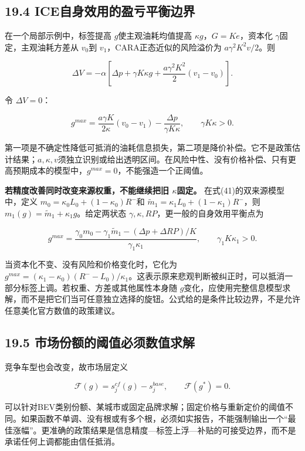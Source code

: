 \documentclass[
  11pt,
]{article}
\begin{document}
\subsection{19.4
ICE自身效用的盈亏平衡边界}\label{iceux81eaux8eabux6548ux7528ux7684ux76c8ux4e8fux5e73ux8861ux8fb9ux754c}

在一个局部示例中，标签提高 \(g\)使主观油耗均值提高
\(\kappa g\)，\(G=Ke\)，资本化 \(\gamma\)固定，主观油耗方差从 \(v_0\)到
\(v_1\)，CARA正态近似的风险溢价为 \(a\gamma^2K^2v/2\)。则

\[
\Delta V=-\alpha\left[
\Delta p+\gamma K\kappa g
+\frac{a\gamma^2K^2}{2}(v_1-v_0)
\right]. \tag{84}
\]

令 \(\Delta V=0\)：

\[
\boxed{
 g^{max}=\frac{a\gamma K}{2\kappa}(v_0-v_1)
-\frac{\Delta p}{\gamma K\kappa},\qquad\gamma K\kappa>0.
}
\tag{85}
\]

第一项是不确定性降低可抵消的油耗信息损失，第二项是降价补偿。它不是政策估计结果；\(a,\kappa,v\)须独立识别或给出透明区间。在风险中性、没有价格补偿、只有更高预期成本的模型中，\(g^{max}=0\)，不能强造一个正阈值。

\textbf{若精度改善同时改变来源权重，不能继续把旧 \(\kappa\)固定。}
在式(41)的双来源模型中，定义 \(m_0=\kappa_0L_0+(1-\kappa_0)R^-\)和
\(\widetilde m_1=\kappa_1L_0+(1-\kappa_1)R^-\)，则
\(m_1(g)=\widetilde m_1+\kappa_1g\)。给定两状态
\(\gamma,\kappa,RP\)，更一般的自身效用平衡点为

\[
\boxed{g^{max}
=\frac{\gamma_0m_0-\gamma_1\widetilde m_1-(\Delta p+\Delta RP)/K}
{\gamma_1\kappa_1},\qquad\gamma_1K\kappa_1>0.}
\tag{85a}
\]

当资本化不变、没有风险和价格变化时，它化为
\(g^{max}=(\kappa_1-\kappa_0)(R^--L_0)/\kappa_1\)。这表示原来悲观判断被纠正时，可以抵消一部分标签上调。若权重、方差或其他属性本身随
\(g\)变化，应使用完整信息模型求解，而不是把它们当可任意独立选择的旋钮。公式给的是条件比较边界，不是允许任意美化官方数值的政策建议。

\subsection{19.5
市场份额的阈值必须数值求解}\label{ux5e02ux573aux4efdux989dux7684ux9608ux503cux5fc5ux987bux6570ux503cux6c42ux89e3}

竞争车型也会改变，故市场层定义

\[
\mathcal F(g)=s_j^{cf}(g)-s_j^{base},\qquad
\mathcal F(g^*)=0. \tag{86}
\]

可以针对BEV类别份额、某城市或固定品牌求解；固定价格与重新定价的阈值不同。如果函数不单调、没有根或有多个根，必须如实报告，不能强制输出一个``最佳涨幅''。更准确的政策结果是信息精度---标签上浮---补贴的可接受边界，而不是承诺任何上调都能由信任抵消。
\end{document}
